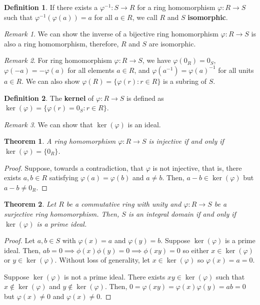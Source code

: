 \documentclass[
    parskip=half,
    toc=flat,
    toc=sectionentrydotfill,
]{scrartcl}  %
\theoremstyle{definition}
\newtheorem{definition}{Definition}[section]
\theoremstyle{plain}
\newtheorem{theorem}{Theorem}[definition]
\theoremstyle{remark}
\newtheorem{remark}{Remark}[definition]
\begin{document}
\begin{definition}
    If there exists a $\varphi^{-1}:S\to R$ for a ring homomorphism
    $\varphi:R\to S$ such that $\varphi^{-1}(\varphi(a))=a$ for all $a\in R$,
    we call $R$ and $S$ \textbf{isomorphic}.
\end{definition}

\begin{remark}
    We can show the inverse of a bijective ring homomorphism $\varphi:R\to S$
    is also a ring homomorphism, therefore, $R$ and $S$ are isomorphic.
\end{remark}

\begin{remark}
    For ring homomorphism $\varphi:R\to S$, we have $\varphi(0_R)=0_S$,
    $\varphi(-a)=-\varphi(a)$ for all elements $a\in R$, and
    $\varphi(a^{-1})=\varphi(a)^{-1}$ for all units $a\in R$.
    We can also show $\varphi(R)=\{\varphi(r):r\in R\}$ is a subring of $S$.
\end{remark}

\begin{definition}
    The \textbf{kernel} of $\varphi:R\to S$ is defined as
    $\ker(\varphi)=\{\varphi(r)=0_S:r\in R\}$.
\end{definition}

\begin{remark}
    We can show that $\ker(\varphi)$ is an ideal.
\end{remark}

\begin{theorem}
    A ring homomorphism $\varphi:R\to S$ is injective if and only if
    $\ker(\varphi)=\{0_R\}$.
\end{theorem}

\begin{proof}
    Suppose, towards a contradiction, that $\varphi$ is not injective, that is,
    there exists $a,b\in R$ satisfying $\varphi(a)=\varphi(b)$ and $a\neq b$.
    Then, $a-b\in\ker(\varphi)$ but $a-b\neq 0_R$.
\end{proof}

\begin{theorem}
    Let $R$ be a commutative ring with unity and $\varphi:R\to S$ be a
    surjective ring homomorphism. Then, $S$ is an integral domain if and only
    if $\ker(\varphi)$ is a prime ideal.
\end{theorem}

\begin{proof}
    Let $a,b\in S$ with $\varphi(x)=a$ and $\varphi(y)=b$.
    Suppose $\ker(\varphi)$ is a prime ideal.
    Then, $ab=0\implies\phi(x)\phi(y)=0\implies\phi(xy)=0$ so either
    $x\in\ker(\varphi)$ or $y\in\ker(\varphi)$.
    Without loss of generality, let $x\in\ker(\varphi)$ so
    $\varphi(x)=a=0$.

    Suppose $\ker(\varphi)$ is not a prime ideal.
    There exists $xy\in\ker(\varphi)$ such that $x\notin\ker(\varphi)$ and
    $y\notin\ker(\varphi)$.
    Then, $0=\varphi(xy)=\varphi(x)\varphi(y)=ab=0$ but $\varphi(x)\neq 0$ and
    $\varphi(x)\neq 0$.
\end{proof}
\end{document}
